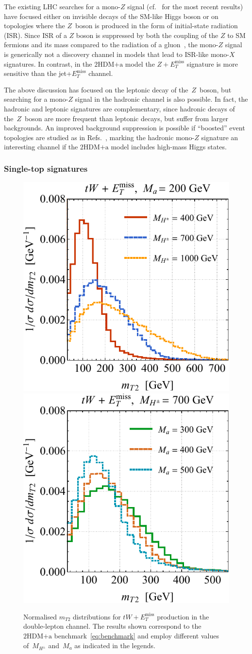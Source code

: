\documentclass[a4paper, 11pt,notoc]{article}
\newcommand{\MET}{\ensuremath{E_T^\mathrm{miss}}\xspace}
\newcommand{\ma}{\ensuremath{M_{a}}\xspace}
\newcommand{\mHc}{\ensuremath{M_{H^{\pm}}}\xspace}
\newcommand{\hdma}{\ensuremath{\textrm{2HDM+a}}\xspace}
\begin{document}
The existing LHC searches for a mono-$Z$ signal (cf.~\cite{Aaboud:2017bja,Sirunyan:2017qfc} for the most recent results) have focused either on invisible decays of the SM-like Higgs boson or on topologies where the $Z$~boson is produced in the form of initial-state radiation (ISR).  Since ISR of a $Z$ boson is suppressed by both the coupling of the $Z$ to SM fermions and its mass compared to the radiation of a gluon~\cite{Petriello:2008pu,Bell:2012rg,Carpenter:2012rg}, the mono-$Z$ signal is generically not a discovery channel in models that lead to ISR-like mono-$X$ signatures. In contrast, in the \hdma model the $Z+\MET$ signature is more sensitive than the jet+$\MET$ channel.

The above discussion has focused on the leptonic decay of the~$Z$~boson, but searching for a mono-$Z$ signal in the hadronic channel is also possible. In fact, the hadronic and leptonic signatures  are complementary, since hadronic decays of the~$Z$~boson are more frequent than leptonic decays, but suffer from larger backgrounds. An improved background suppression is possible if ``boosted'' event topologies are studied as in Refs.~\cite{Aad:2013oja,Sirunyan:2017jix}, marking the hadronic mono-$Z$ signature an interesting channel if the \hdma model includes high-mass Higgs states. 

\subsubsection{Single-top signatures}

\begin{figure}[t!]
\centering
\includegraphics[height=0.45\textwidth]{mt2l.pdf} \qquad 
\includegraphics[height=0.45\textwidth]{mt2r.pdf}
\vspace{2mm}
\caption{\label{fig:mt2spectra} Normalised $m_{T2}$ distributions for $tW+\MET$ production in the double-lepton channel.  The  results shown correspond to the \hdma benchmark~\eqref{eq:benchmark} and employ different values of~$\mHc$ and~$\ma$ as indicated in the legends.}
\end{figure}
\end{document}
